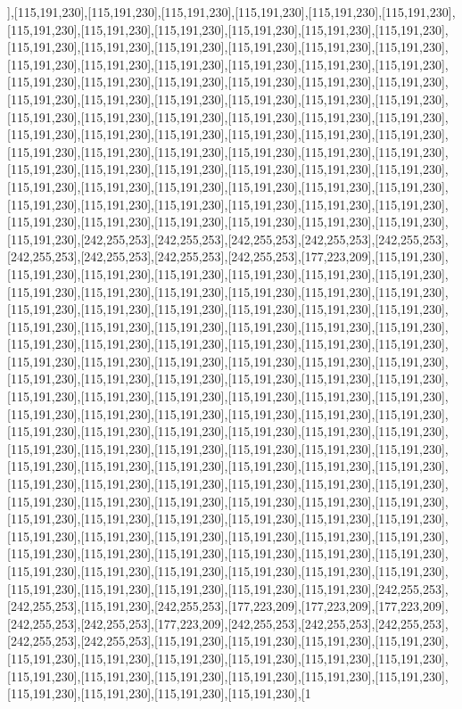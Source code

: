 ],[115,191,230],[115,191,230],[115,191,230],[115,191,230],[115,191,230],[115,191,230],[115,191,230],[115,191,230],[115,191,230],[115,191,230],[115,191,230],[115,191,230],[115,191,230],[115,191,230],[115,191,230],[115,191,230],[115,191,230],[115,191,230],[115,191,230],[115,191,230],[115,191,230],[115,191,230],[115,191,230],[115,191,230],[115,191,230],[115,191,230],[115,191,230],[115,191,230],[115,191,230],[115,191,230],[115,191,230],[115,191,230],[115,191,230],[115,191,230],[115,191,230],[115,191,230],[115,191,230],[115,191,230],[115,191,230],[115,191,230],[115,191,230],[115,191,230],[115,191,230],[115,191,230],[115,191,230],[115,191,230],[115,191,230],[115,191,230],[115,191,230],[115,191,230],[115,191,230],[115,191,230],[115,191,230],[115,191,230],[115,191,230],[115,191,230],[115,191,230],[115,191,230],[115,191,230],[115,191,230],[115,191,230],[115,191,230],[115,191,230],[115,191,230],[115,191,230],[115,191,230],[115,191,230],[115,191,230],[115,191,230],[115,191,230],[115,191,230],[115,191,230],[115,191,230],[115,191,230],[115,191,230],[115,191,230],[115,191,230],[115,191,230],[115,191,230],[242,255,253],[242,255,253],[242,255,253],[242,255,253],[242,255,253],[242,255,253],[242,255,253],[242,255,253],[242,255,253],[177,223,209],[115,191,230],[115,191,230],[115,191,230],[115,191,230],[115,191,230],[115,191,230],[115,191,230],[115,191,230],[115,191,230],[115,191,230],[115,191,230],[115,191,230],[115,191,230],[115,191,230],[115,191,230],[115,191,230],[115,191,230],[115,191,230],[115,191,230],[115,191,230],[115,191,230],[115,191,230],[115,191,230],[115,191,230],[115,191,230],[115,191,230],[115,191,230],[115,191,230],[115,191,230],[115,191,230],[115,191,230],[115,191,230],[115,191,230],[115,191,230],[115,191,230],[115,191,230],[115,191,230],[115,191,230],[115,191,230],[115,191,230],[115,191,230],[115,191,230],[115,191,230],[115,191,230],[115,191,230],[115,191,230],[115,191,230],[115,191,230],[115,191,230],[115,191,230],[115,191,230],[115,191,230],[115,191,230],[115,191,230],[115,191,230],[115,191,230],[115,191,230],[115,191,230],[115,191,230],[115,191,230],[115,191,230],[115,191,230],[115,191,230],[115,191,230],[115,191,230],[115,191,230],[115,191,230],[115,191,230],[115,191,230],[115,191,230],[115,191,230],[115,191,230],[115,191,230],[115,191,230],[115,191,230],[115,191,230],[115,191,230],[115,191,230],[115,191,230],[115,191,230],[115,191,230],[115,191,230],[115,191,230],[115,191,230],[115,191,230],[115,191,230],[115,191,230],[115,191,230],[115,191,230],[115,191,230],[115,191,230],[115,191,230],[115,191,230],[115,191,230],[115,191,230],[115,191,230],[115,191,230],[115,191,230],[115,191,230],[115,191,230],[115,191,230],[115,191,230],[115,191,230],[115,191,230],[115,191,230],[115,191,230],[115,191,230],[115,191,230],[115,191,230],[115,191,230],[115,191,230],[115,191,230],[115,191,230],[115,191,230],[242,255,253],[242,255,253],[115,191,230],[242,255,253],[177,223,209],[177,223,209],[177,223,209],[242,255,253],[242,255,253],[177,223,209],[242,255,253],[242,255,253],[242,255,253],[242,255,253],[242,255,253],[115,191,230],[115,191,230],[115,191,230],[115,191,230],[115,191,230],[115,191,230],[115,191,230],[115,191,230],[115,191,230],[115,191,230],[115,191,230],[115,191,230],[115,191,230],[115,191,230],[115,191,230],[115,191,230],[115,191,230],[115,191,230],[115,191,230],[115,191,230],[1